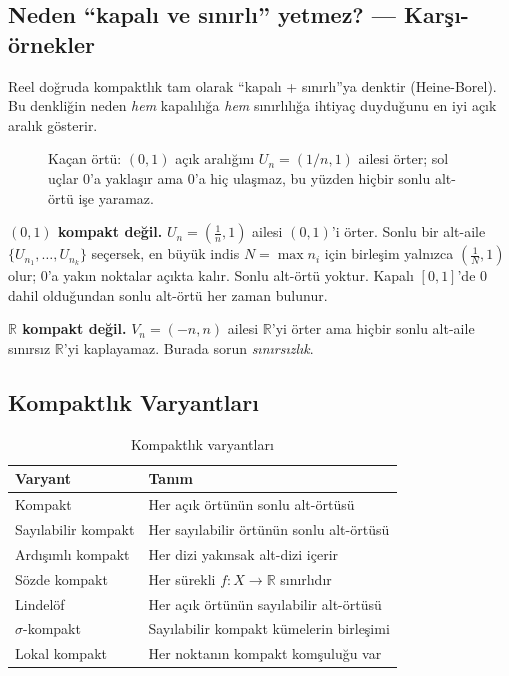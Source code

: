 \subsection{Neden ``kapalı ve sınırlı'' yetmez? — Karşı-örnekler}

Reel doğruda kompaktlık tam olarak ``kapalı + sınırlı''ya denktir (Heine-Borel).
Bu denkliğin neden \emph{hem} kapalılığa \emph{hem} sınırlılığa ihtiyaç
duyduğunu en iyi açık aralık gösterir.

\begin{figure}[ht]
  \centering
  
  \caption{Kaçan örtü: $(0,1)$ açık aralığını $U_n=(1/n,1)$ ailesi örter; sol
    uçlar $0$'a yaklaşır ama $0$'a hiç ulaşmaz, bu yüzden hiçbir sonlu alt-örtü
    işe yaramaz.}
\end{figure}

\begin{karsiornek}
\textbf{$(0,1)$ kompakt değil.} $U_n = \left(\tfrac{1}{n}, 1\right)$ ailesi
$(0,1)$'i örter. Sonlu bir alt-aile $\{U_{n_1}, \dots, U_{n_k}\}$ seçersek, en
büyük indis $N=\max n_i$ için birleşim yalnızca $\left(\tfrac{1}{N}, 1\right)$
olur; $0$'a yakın noktalar açıkta kalır. Sonlu alt-örtü yoktur. Kapalı $[0,1]$'de
$0$ dahil olduğundan sonlu alt-örtü her zaman bulunur.

\medskip
\textbf{$\mathbb{R}$ kompakt değil.} $V_n = (-n, n)$ ailesi $\mathbb{R}$'yi örter
ama hiçbir sonlu alt-aile sınırsız $\mathbb{R}$'yi kaplayamaz. Burada sorun
\emph{sınırsızlık}.
\end{karsiornek}

\subsection{Kompaktlık Varyantları}

\begin{table}[h]
\centering
\begin{tabular}{ll}
\toprule
\textbf{Varyant} & \textbf{Tanım} \\
\midrule
Kompakt & Her açık örtünün sonlu alt-örtüsü \\
Sayılabilir kompakt & Her sayılabilir örtünün sonlu alt-örtüsü \\
Ardışımlı kompakt & Her dizi yakınsak alt-dizi içerir \\
Sözde kompakt & Her sürekli $f: X \to \mathbb{R}$ sınırlıdır \\
Lindelöf & Her açık örtünün sayılabilir alt-örtüsü \\
$\sigma$-kompakt & Sayılabilir kompakt kümelerin birleşimi \\
Lokal kompakt & Her noktanın kompakt komşuluğu var \\
\bottomrule
\end{tabular}
\caption{Kompaktlık varyantları}
\end{table}

